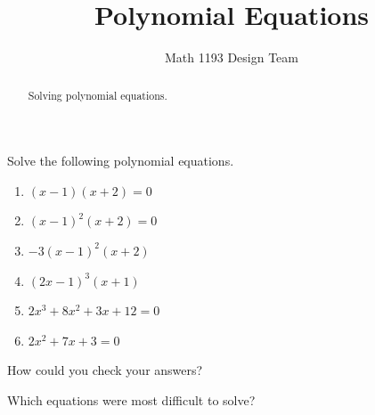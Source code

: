 \documentclass[noauthor]{ximera}
\title{Polynomial Equations}
\author{Math 1193 Design Team}
\begin{document}
\begin{abstract}
    Solving polynomial equations.
\end{abstract}
\maketitle

Solve the following polynomial equations.

\begin{enumerate}
    \item \((x - 1)(x + 2) = 0\)
    \item \((x - 1)^2(x + 2) = 0\)
    \item \(-3(x - 1)^2(x + 2)\)
    \item \((2x - 1)^3(x + 1)\)
    \item \(2x^3 + 8x^2 + 3x + 12 = 0\)
    \item \(2x^2 + 7x + 3 = 0\)
\end{enumerate}

How could you check your answers? 

Which equations were most difficult to solve?
\end{document}
